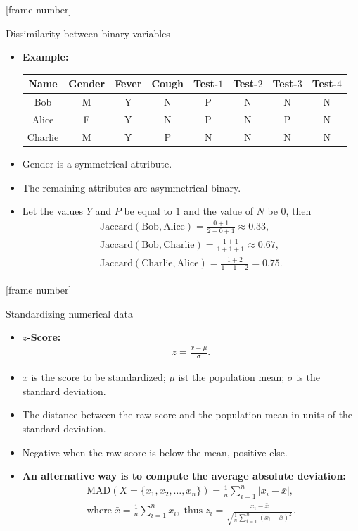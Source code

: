 \documentclass[aspectratio=169,t]{beamer}
\begin{document}
  {
    [frame number]
    \begin{frame}{Dissimilarity between binary variables}
    \begin{itemize}
        \item \textbf{Example:}\;
        \begin{tabular}{| c | c | c | c | c | c | c | c |}
        \hline
        Name & Gender & Fever & Cough & Test-$1$ & Test-$2$ & Test-$3$ & Test-$4$\\\hline
        Bob & M & Y & N & P & N & N & N \\
        Alice & F & Y & N & P & N & P & N \\
        Charlie & M & Y & P & N & N & N & N \\\hline
        \end{tabular}
        \item Gender is a symmetrical attribute.
        \item The remaining attributes are asymmetrical binary.
        \item Let the values $Y$ and $P$ be equal to $1$ and the value of $N$ be $0$, then
        \begin{align}
          \text{Jaccard}(\text{Bob}, \text{Alice}) = \frac{0+1}{2+0+1} \approx 0.33,\\
          \text{Jaccard}(\text{Bob}, \text{Charlie}) = \frac{1+1}{1+1+1} \approx 0.67,\\
          \text{Jaccard}(\text{Charlie}, \text{Alice}) = \frac{1+2}{1+1+2} = 0.75.
        \end{align}
    \end{itemize}
    \end{frame}
  }

  {
    [frame number]
    \begin{frame}{Standardizing numerical data}
    \begin{itemize}
      \item \textbf{$z$-Score:}
            \begin{align}
              z = \frac{x-\mu}{\sigma}.
            \end{align}
      \item $x$ is the score to be standardized; $\mu$ ist the population mean; $\sigma$ is the standard deviation.
      \item The distance between the raw score and the population mean in units of the standard deviation.
      \item Negative when the raw score is below the mean, positive else.
      \item \textbf{An alternative way is to compute the average absolute deviation:}
      \begin{align}
      \text{MAD}(X = \{x_1,x_2,\ldots,x_n\}) = \frac{1}{n} \sum_{i=1}^{n} \vert x_i - \bar{x} \vert,\\
      \text{where} \; \bar{x} = \frac{1}{n} \sum_{i=1}^{n}x_i, \; \text{thus} \; z_i = \frac{x_i-\bar{x}}{\sqrt{\frac{1}{n}\sum_{i=1}^{n}(x_i-\bar{x})^2}}.
      \end{align}
    \end{itemize}
    \end{frame}
  }
\end{document}
